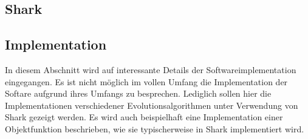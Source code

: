 %
\lstset{
	basicstyle=\scriptsize,
	language=C++,
	breaklines=true,
	frame=tbrl,
	breakatwhitespace=false
	breaklines=true,  
	xleftmargin=1cm,
	tabsize=2,
	showstringspaces=false}
%
\subsection{Shark}
\label{sec:Shark}
\lipsum[1]
%
\subsection{Implementation}
In diesem Abschnitt wird auf interessante Details der Softwareimplementation eingegangen. Es ist nicht möglich im vollen Umfang die Implementation der Softare aufgrund ihres Umfangs zu besprechen. Lediglich sollen hier die Implementationen verschiedener Evolutionsalgorithmen unter Verwendung von Shark gezeigt werden. Es wird auch beispielhaft eine Implementation einer Objektfunktion beschrieben, wie sie typischerweise in Shark implementiert wird.
%
%
